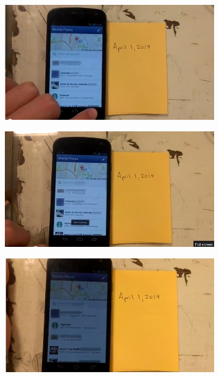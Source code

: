 \begin{figure}[t]

\begin{subfigure}[t]{0.33\textwidth}
\includegraphics[width=\textwidth]{./figures/apps/facebook/facebook1.png}
\caption{}
\end{subfigure}%
\begin{subfigure}[t]{0.33\textwidth}
\includegraphics[width=\textwidth]{./figures/apps/facebook/facebook2.png}
\caption{}
\end{subfigure}%
\begin{subfigure}[t]{0.33\textwidth}
\includegraphics[width=\textwidth]{./figures/apps/facebook/facebook3.png}
\caption{}
\end{subfigure}


\end{figure}
